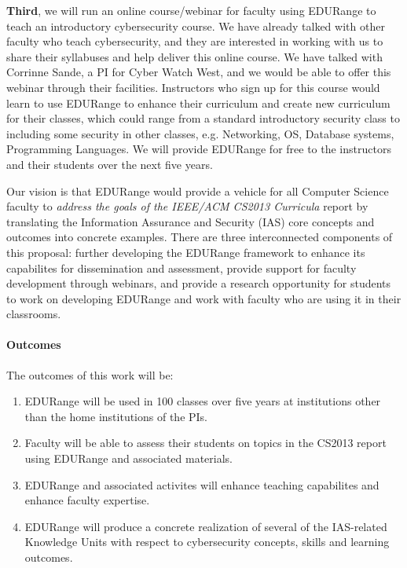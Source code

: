 {\bf Third}, we will run an online course/webinar for faculty using EDURange to teach an introductory cybersecurity
course.  We have already talked with other faculty who teach cybersecurity, and they are interested in 
working with us to share their syllabuses and help deliver this online course.  We have talked with 
Corrinne Sande, a PI for Cyber Watch West, and we would be able to offer this webinar through their 
facilities.
Instructors who sign up for this course would learn
to use EDURange to enhance their curriculum and create new curriculum for their classes, which could range from 
a standard introductory
security class to including some 
security in other classes, e.g. Networking, OS, Database systems, Programming Languages.
We will provide EDURange for free to the instructors and their students over the next five years.


Our vision is that EDURange would provide a vehicle for all Computer Science faculty to {\em address the goals of 
the IEEE/ACM CS2013
Curricula} report by translating the Information Assurance and Security (IAS) core concepts and outcomes into
concrete examples.  There are three interconnected components of this proposal: further developing the
EDURange framework to enhance its capabilites for dissemination and assessment, provide support for faculty development
through webinars, and provide a research opportunity for students to work on developing EDURange and work
with faculty who are using it in their classrooms.
\paragraph{Outcomes}
The outcomes of this work will be:
\begin{enumerate}
\item EDURange will be used in 100 classes over five years at institutions other than the home institutions of
  the PIs.
\item Faculty will be able to assess their students on topics in the CS2013 report using EDURange and 
  associated materials.
\item EDURange and associated activites will enhance teaching capabilites and enhance faculty expertise.
\item EDURange will produce a concrete realization of several of the IAS-related Knowledge Units
  with respect to cybersecurity concepts, skills and learning outcomes.
\end{enumerate}




